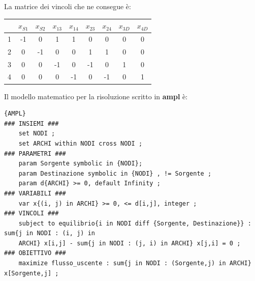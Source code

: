 La matrice dei vincoli che ne consegue è:
\begin{table}[!ht]
	\begin{adjustbox}{width=0.4\columnwidth, center}
		\begin{tabular}{|c|c|c|c|c|c|c|c|c|}
			\hline
			  & $x_{S1}$ & $x_{S2}$ & $x_{13}$ & $x_{14}$ & $x_{23}$ & $x_{24}$ & $x_{3D}$ & $x_{4D}$ \\
			\hline
			1 & -1       & 0        & 1        & 1        & 0        & 0        & 0        & 0        \\
			2 & 0        & -1       & 0        & 0        & 1        & 1        & 0        & 0        \\
			3 & 0        & 0        & -1       & 0        & -1       & 0        & 1        & 0        \\
			4 & 0        & 0        & 0        & -1       & 0        & -1       & 0        & 1        \\
			\hline
		\end{tabular}
	\end{adjustbox}
\end{table}

Il modello matematico per la risoluzione scritto in \textbf{ampl} è:
\begin{lstlisting}{AMPL}
### INSIEMI ###
    set NODI ;
    set ARCHI within NODI cross NODI ;
### PARAMETRI ###
    param Sorgente symbolic in {NODI};
    param Destinazione symbolic in {NODI} , != Sorgente ;
    param d{ARCHI} >= 0, default Infinity ;
### VARIABILI ###
    var x{(i, j) in ARCHI} >= 0, <= d[i,j], integer ;
### VINCOLI ###
    subject to equilibrio{i in NODI diff {Sorgente, Destinazione}} : sum{j in NODI : (i, j) in
    ARCHI} x[i,j] - sum{j in NODI : (j, i) in ARCHI} x[j,i] = 0 ;
### OBIETTIVO ###
    maximize flusso_uscente : sum{j in NODI : (Sorgente,j) in ARCHI} x[Sorgente,j] ;
\end{lstlisting}



